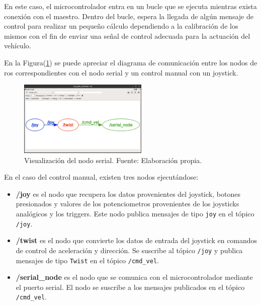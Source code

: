         En este caso, el microcontrolador entra en un bucle que se ejecuta mientras exista conexión con el maestro. Dentro del 
        bucle, espera la llegada de algún mensaje de control para realizar un pequeño cálculo dependiendo a la calibración de 
        los mismos con el fin de enviar una señal de control adecuada para la actuación del vehículo.

        En la Figura(\ref{fig:joy_serial}) se puede apreciar el diagrama de comunicación entre los nodos de ros correspondientes con el nodo serial 
        y un control manual con un joystick.


        \begin{figure}[!h] 
            \centering
            \includegraphics[width=0.55\textwidth]{img/joy_serial}
            \caption[Visualización del nodo serial]{Visualización del nodo serial. Fuente: Elaboración propia. }
            \label{fig:joy_serial}
        \end{figure}
        
        En el caso del control manual, existen tres nodos ejecutándose:
        \begin{itemize}
            \item \textbf{/joy} es el nodo que recupera los datos provenientes del joystick, botones presionados y valores de los potenciometros provenientes de los joysticks analógicos y los triggers. Este nodo publica mensajes de tipo \lstinline{joy} en el tópico \lstinline{/joy}.
            \item \textbf{/twist} es el nodo que convierte los datos de entrada del joystick en comandos de control de aceleración y dirección. Se suscribe al tópico \lstinline{/joy} y publica mensajes de tipo \lstinline{Twist} en el tópico \lstinline{/cmd_vel}.
            \item \textbf{/serial\_node} es el nodo que se comunica con el microcontrolador mediante el puerto serial. El nodo se suscribe a los mensajes publicados en el tópico \lstinline{/cmd_vel}.
        \end{itemize}

